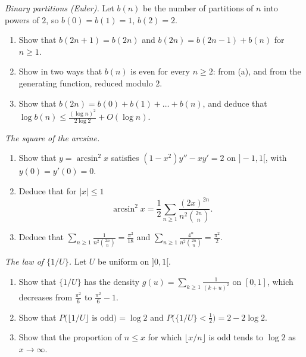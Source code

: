 \begin{exercise}[$\star\star$]\label{pb:binarypart}
\emph{Binary partitions (Euler).} Let $b(n)$ be the number of partitions of $n$ into powers of $2$, so $b(0)=b(1)=1$, $b(2)=2$.
\begin{enumerate}[label=(\alph*)]
\item Show that $b(2n+1)=b(2n)$ and $b(2n)=b(2n-1)+b(n)$ for $n\ge1$.
\item Show in two ways that $b(n)$ is even for every $n\ge2$: from (a), and from the generating function, reduced modulo $2$.
\item Show that $b(2n)=b(0)+b(1)+\dots+b(n)$, and deduce that $\log b(n)\le\frac{(\log n)^2}{2\log2}+O(\log n)$.
\end{enumerate}
\end{exercise}

\begin{exercise}[$\star\star$]\label{pb:arcsin}
\emph{The square of the arcsine.}
\begin{enumerate}[label=(\alph*)]
\item Show that $y=\arcsin^2x$ satisfies $(1-x^2)y''-xy'=2$ on $]-1,1[$, with $y(0)=y'(0)=0$.
\item Deduce that for $|x|\le1$
\[
\arcsin^2x=\frac12\sum_{n\ge1}\frac{(2x)^{2n}}{n^2\binom{2n}n}.
\]
\item Deduce that $\displaystyle\sum_{n\ge1}\frac1{n^2\binom{2n}n}=\frac{\pi^2}{18}$ and $\displaystyle\sum_{n\ge1}\frac{4^n}{n^2\binom{2n}n}=\frac{\pi^2}2$.
\end{enumerate}
\end{exercise}

\begin{exercise}[$\star\star$]\label{pb:quotientlaw}
\emph{The law of $\{1/U\}$.} Let $U$ be uniform on $]0,1[$.
\begin{enumerate}[label=(\alph*)]
\item Show that $\{1/U\}$ has the density $g(u)=\sum_{k\ge1}\frac1{(k+u)^2}$ on $[0,1]$, which decreases from $\frac{\pi^2}6$ to $\frac{\pi^2}6-1$.
\item Show that $P\bigl(\lfloor1/U\rfloor\text{ is odd}\bigr)=\log2$ and $P\bigl(\{1/U\}<\frac12\bigr)=2-2\log2$.
\item Show that the proportion of $n\le x$ for which $\lfloor x/n\rfloor$ is odd tends to $\log2$ as $x\to\infty$.
\end{enumerate}
\end{exercise}

